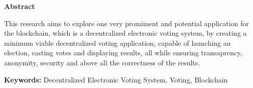 \newpage

\thispagestyle{empty}

\vspace*{2cm}

\begin{center}
\textbf{Abstract}
\end{center}


This research aims to explore one very promiment and potential application for the blockchain, which is a decentralized electronic voting system, by creating a minimum viable decentralized  voting application, capable of launching an election, casting votes and displaying results, all while ensuring transaprency, anonymity, security and above all the correctness of the results.\medskip


\textbf{Keywords:} Decentralized Electronic Voting System, Voting, Blockchain
